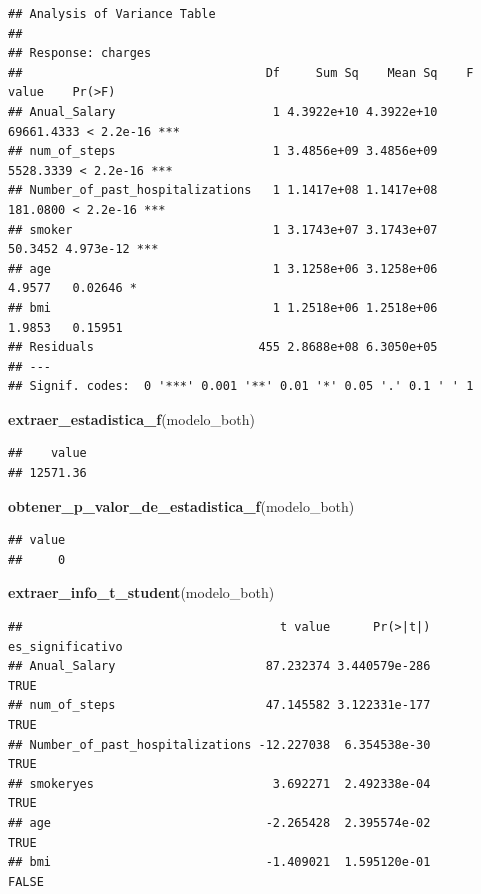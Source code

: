 \documentclass[
]{article}
\newenvironment{Shaded}{\begin{snugshade}}{\end{snugshade}}
\newcommand{\FunctionTok}[1]{\textcolor[rgb]{0.13,0.29,0.53}{\textbf{#1}}}
\newcommand{\NormalTok}[1]{#1}
\begin{document}
\begin{verbatim}
## Analysis of Variance Table
## 
## Response: charges
##                                  Df     Sum Sq    Mean Sq    F value    Pr(>F)    
## Anual_Salary                      1 4.3922e+10 4.3922e+10 69661.4333 < 2.2e-16 ***
## num_of_steps                      1 3.4856e+09 3.4856e+09  5528.3339 < 2.2e-16 ***
## Number_of_past_hospitalizations   1 1.1417e+08 1.1417e+08   181.0800 < 2.2e-16 ***
## smoker                            1 3.1743e+07 3.1743e+07    50.3452 4.973e-12 ***
## age                               1 3.1258e+06 3.1258e+06     4.9577   0.02646 *  
## bmi                               1 1.2518e+06 1.2518e+06     1.9853   0.15951    
## Residuals                       455 2.8688e+08 6.3050e+05                         
## ---
## Signif. codes:  0 '***' 0.001 '**' 0.01 '*' 0.05 '.' 0.1 ' ' 1
\end{verbatim}

\begin{Shaded}
\begin{Highlighting}[]
\FunctionTok{extraer\_estadistica\_f}\NormalTok{(modelo\_both)}
\end{Highlighting}
\end{Shaded}

\begin{verbatim}
##    value 
## 12571.36
\end{verbatim}

\begin{Shaded}
\begin{Highlighting}[]
\FunctionTok{obtener\_p\_valor\_de\_estadistica\_f}\NormalTok{(modelo\_both)}
\end{Highlighting}
\end{Shaded}

\begin{verbatim}
## value 
##     0
\end{verbatim}

\begin{Shaded}
\begin{Highlighting}[]
\FunctionTok{extraer\_info\_t\_student}\NormalTok{(modelo\_both)}
\end{Highlighting}
\end{Shaded}

\begin{verbatim}
##                                    t value      Pr(>|t|) es_significativo
## Anual_Salary                     87.232374 3.440579e-286             TRUE
## num_of_steps                     47.145582 3.122331e-177             TRUE
## Number_of_past_hospitalizations -12.227038  6.354538e-30             TRUE
## smokeryes                         3.692271  2.492338e-04             TRUE
## age                              -2.265428  2.395574e-02             TRUE
## bmi                              -1.409021  1.595120e-01            FALSE
\end{verbatim}
\end{document}

